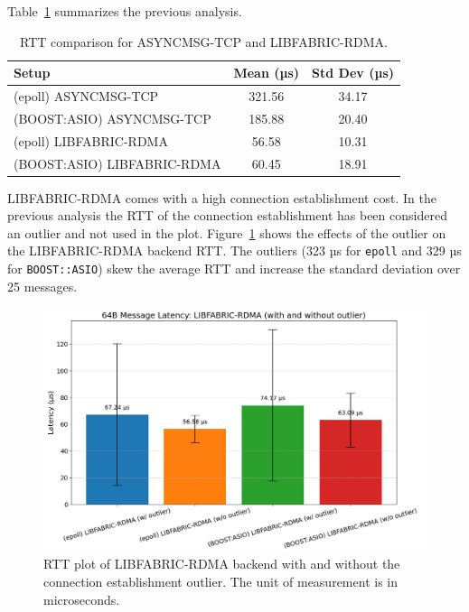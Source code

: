 Table~\ref{tab:rtt-comparison} summarizes the previous analysis.

\begin{table}[ht]
\centering
\begin{tabular}{|l|c|c|}
\hline
\textbf{Setup} & \textbf{Mean (µs)} & \textbf{Std Dev (µs)} \\
\hline
(epoll) ASYNCMSG-TCP & 321.56 & 34.17 \\
(BOOST:ASIO) ASYNCMSG-TCP & 185.88 & 20.40 \\
(epoll) LIBFABRIC-RDMA & 56.58 & 10.31 \\
(BOOST:ASIO) LIBFABRIC-RDMA & 60.45 & 18.91 \\
\hline
\end{tabular}
\caption{RTT comparison for ASYNCMSG-TCP and LIBFABRIC-RDMA.}
\label{tab:rtt-comparison}
\end{table}

LIBFABRIC-RDMA comes with a high connection establishment cost. In the previous analysis the \acs{RTT} of the connection establishment has been considered an outlier and not used in the plot. Figure~\ref{fig:rtt-rdma-outlier} shows the effects of the outlier on the LIBFABRIC-RDMA backend \acs{RTT}. The outliers (323 µs for \texttt{epoll} and 329 µs for \texttt{BOOST::ASIO}) skew the average \acs{RTT} and increase the standard deviation over 25 messages.

\begin{figure}[htbp]
\centering
\includegraphics[width=\textwidth]{images/results/rtt-RDMA-outliers.png}
\caption[RDMA RTT plot, with outliers]{RTT plot of LIBFABRIC-RDMA backend with and without the connection establishment outlier. The unit of measurement is in microseconds.}
\label{fig:rtt-rdma-outlier}
\end{figure}

